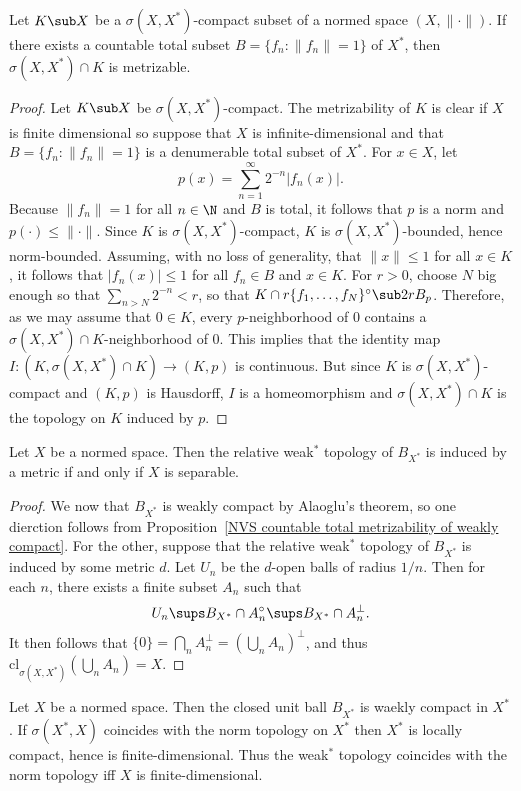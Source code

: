 \begin{proposition}\label{NVS countable total metrizability of weakly compact}
Let $K\sub X$ be a $\sigma(X,X^*)$-compact subset of a normed space $(X,\|\cdot\|)$. If there exists a countable total subset $B=\{f_n:\|f_n\|=1\}$ of $X^*$, then $\sigma(X,X^*)\cap K$ is metrizable.
\end{proposition}
\begin{proof}
Let $K\sub X$ be $\sigma(X,X^*)$-compact. The metrizability of $K$ is clear if $X$ is finite dimensional so suppose that $X$ is infinite-dimensional and that $B=\{f_n:\|f_n\|=1\}$ is a denumerable total subset of $X^*$. For $x\in X$, let
\[p(x)=\sum_{n=1}^{\infty}2^{-n}|f_n(x)|.\]
Because $\|f_n\|=1$ for all $n\in\N$ and $B$ is total, it follows that $p$ is a norm and $p(\cdot)\leq\|\cdot\|$. Since $K$ is $\sigma(X,X^*)$-compact, $K$ is $\sigma(X,X^*)$-bounded, hence norm-bounded. Assuming, with no loss of generality, that $\|x\|\leq 1$ for all $x\in K$, it follows that $|f_n(x)|\leq 1$ for all $f_n\in B$ and $x\in K$. For $r>0$, choose $N$ big enough so that $\sum_{n>N}2^{-n}<r$, so that $K\cap r\{f_1,\dots,f_{N}\}^\circ\sub 2rB_p$. Therefore, as we may assume that $0\in K$, every $p$-neighborhood of $0$ contains a $\sigma(X,X^*)\cap K$-neighborhood of $0$. This implies that the identity map $I:(K,\sigma(X,X^*)\cap K)\to(K,p)$ is continuous. But since $K$ is $\sigma(X,X^*)$-compact and $(K,p)$ is Hausdorff, $I$ is a homeomorphism and $\sigma(X,X^*)\cap K$ is the topology on $K$ induced by $p$.
\end{proof}
\begin{proposition}\label{NVS dual unit ball weakly metrizable iff}
Let $X$ be a normed space. Then the relative weak$^*$ topology of $B_{X^*}$ is induced by a metric if and only if $X$ is separable.
\end{proposition}
\begin{proof}
We now that $B_{X^*}$ is weakly compact by Alaoglu's theorem, so one dierction follows from Proposition~\ref{NVS countable total metrizability of weakly compact}. For the other, suppose that the relative weak$^*$ topology of $B_{X^*}$ is induced by some metric $d$. Let $U_n$ be the $d$-open balls of radius $1/n$. Then for each $n$, there exists a finite subset $A_n$ such that
\[U_n\sups B_{X^*}\cap A_n^\circ\sups B_{X^*}\cap A_n^\bot.\]
It then follows that $\{0\}=\bigcap_nA_n^\bot=(\bigcup_nA_n)^\bot$, and thus $\mathrm{cl}_{\sigma(X,X^*)}(\bigcup_nA_n)=X$.
\end{proof}
\begin{example}
Let $X$ be a normed space. Then the closed unit ball $B_{X^*}$ is waekly compact in $X^*$. If $\sigma(X^*,X)$ coincides with the norm topology on $X^*$ then $X^*$ is locally compact, hence is finite-dimensional. Thus the weak$^*$ topology coincides with the norm topology iff $X$ is finite-dimensional.
\end{example}
